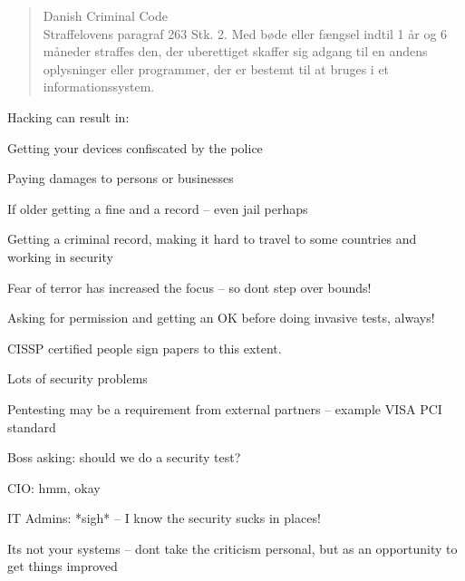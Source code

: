 \documentclass[Screen16to9,17pt]{foils}
\begin{document}

\begin{quote}\small
Danish Criminal Code\\
Straffelovens paragraf 263 Stk. 2. Med bøde eller fængsel indtil 1 år og 6 måneder straffes den, der uberettiget skaffer sig adgang til en andens oplysninger eller programmer, der er bestemt til at bruges i et informationssystem.
\end{quote}

Hacking can result in:
\begin{list2}
\item Getting your devices confiscated by the police
\item Paying damages to persons or businesses
\item If older getting a fine and a record -- even jail perhaps
\item Getting a criminal record, making it hard to travel to some countries and working in security
\item Fear of terror has increased the focus -- so dont step over bounds!
\end{list2}

Asking for permission and getting an OK before doing invasive tests, always!



CISSP certified people sign papers to this extent.\\



\begin{list1}
\item Lots of security problems
\item Pentesting may be a requirement from external partners -- example VISA PCI standard
\end{list1}

\begin{list2}
\item Boss asking: should we do a security test?
\item CIO: hmm, okay
\item IT Admins: *sigh* -- I know the security sucks in places!
\item Its not your systems -- dont take the criticism personal, but as an opportunity to get things improved
\end{list2}
\end{document}
